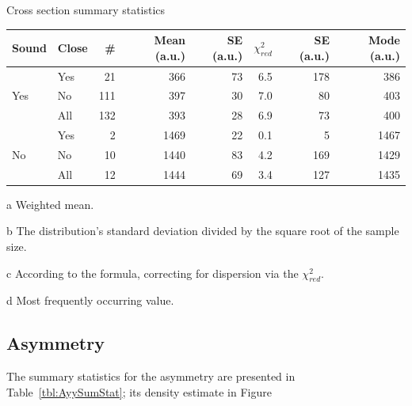 \documentclass{report}
\begin{document}
\begin{threeparttable}[H]
	\centering
	\caption{Cross section summary statistics\label{tbl:CS0SumStat}}
	\begin{tabular}{llrrrrrr}
		\hline\hline
		Sound                & Close &  \# & Mean\tnote{a} (a.u.) & SE\tnote{b} (a.u.) & $\chi^2_{red}$ & SE\tnote{c} (a.u.) &  Mode\tnote{d} (a.u.)\\ \hline
		\multirow{3}{*}{Yes} & Yes   &  21 &                  366 &                 73 &            6.5 &                178 &  386 \\
		                     & No    & 111 &                  397 &                 30 &            7.0 &                 80 &  403 \\
		                     & All   & 132 &                  393 &                 28 &            6.9 &                 73 &  400 \\ \hline
		\multirow{3}{*}{No}  & Yes   &   2 &                 1469 &                 22 &            0.1 &                  5 & 1467 \\
		                     & No    &  10 &                 1440 &                 83 &            4.2 &                169 & 1429 \\
		                     & All   &  12 &                 1444 &                 69 &            3.4 &                127 & 1435 \\ \hline
	\end{tabular}
	\begin{tablenotes}
		\item[a]{Weighted mean.}
		\item[b]{The distribution's standard deviation divided by the square root of the sample size.}
		\item[c]{According to the formula, correcting for dispersion via the $\chi^2_{red}$.}
		\item[d]{Most frequently occurring value.}
	\end{tablenotes}
\end{threeparttable}

\subsection{Asymmetry}

The summary statistics for the asymmetry are presented in Table~\ref{tbl:AyySumStat}; its density estimate in Figure~
\end{document}
